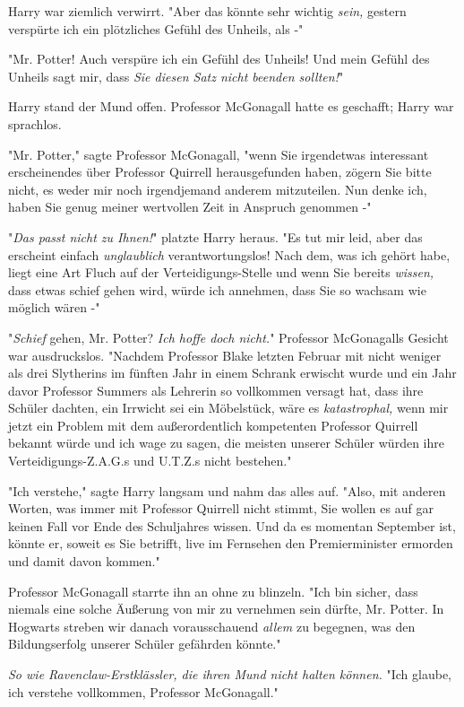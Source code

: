 {Harry war ziemlich verwirrt. "Aber das könnte sehr wichtig \emph{sein,} gestern verspürte ich ein plötzliches Gefühl des Unheils, als -"

"Mr. Potter! Auch verspüre ich ein Gefühl des Unheils! Und mein Gefühl des Unheils sagt mir, dass \emph{Sie diesen Satz nicht beenden sollten!}"

Harry stand der Mund offen. Professor McGonagall hatte es geschafft; Harry war sprachlos.

"Mr. Potter," sagte Professor McGonagall, "wenn Sie irgendetwas interessant erscheinendes über Professor Quirrell herausgefunden haben, zögern Sie bitte nicht, es weder mir noch irgendjemand anderem mitzuteilen. Nun denke ich, haben Sie genug meiner wertvollen Zeit in Anspruch genommen -"

"\emph{Das passt nicht zu Ihnen!}" platzte Harry heraus. "Es tut mir leid, aber das erscheint einfach \emph{unglaublich} verantwortungslos! Nach dem, was ich gehört habe, liegt eine Art Fluch auf der Verteidigungs-Stelle und wenn Sie bereits \emph{wissen,} dass etwas schief gehen wird, würde ich annehmen, dass Sie so wachsam wie möglich wären -"

"\emph{Schief} gehen, Mr. Potter? \emph{Ich hoffe doch nicht.}" Professor McGonagalls Gesicht war ausdruckslos. "Nachdem Professor Blake letzten Februar mit nicht weniger als drei Slytherins im fünften Jahr in einem Schrank erwischt wurde und ein Jahr davor Professor Summers als Lehrerin so vollkommen versagt hat, dass ihre Schüler dachten, ein Irrwicht sei ein Möbelstück, wäre es \emph{katastrophal,} wenn mir jetzt ein Problem mit dem außerordentlich kompetenten Professor Quirrell bekannt würde und ich wage zu sagen, die meisten unserer Schüler würden ihre Verteidigungs-Z.A.G.s und U.T.Z.s nicht bestehen."

"Ich verstehe," sagte Harry langsam und nahm das alles auf. "Also, mit anderen Worten, was immer mit Professor Quirrell nicht stimmt, Sie wollen es auf gar keinen Fall vor Ende des Schuljahres wissen. Und da es momentan September ist, könnte er, soweit es Sie betrifft, live im Fernsehen den Premierminister ermorden und damit davon kommen."

Professor McGonagall starrte ihn an ohne zu blinzeln. "Ich bin sicher, dass niemals eine solche Äußerung von mir zu vernehmen sein dürfte, Mr. Potter. In Hogwarts streben wir danach vorausschauend \emph{allem} zu begegnen, was den Bildungserfolg unserer Schüler gefährden könnte."

\emph{So wie Ravenclaw-Erstklässler, die ihren Mund nicht halten können.} "Ich glaube, ich verstehe vollkommen, Professor McGonagall."

}
